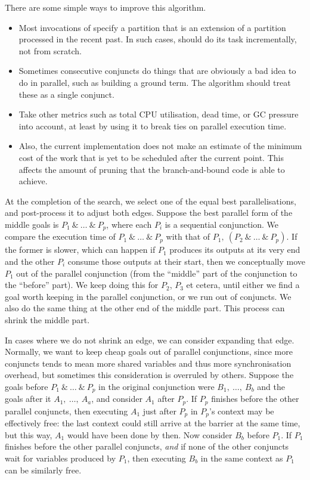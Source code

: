 There are some simple ways to improve this algorithm.

\begin{itemize}
\item
Most invocations of \findpartime specify a partition
that is an extension of a partition processed in the recent past.
In such cases, \findpartime should do its task
incrementally, not from scratch.
\item
Sometimes consecutive conjuncts do things that are
obviously a bad idea to do in parallel, such as building a ground term.
The algorithm should treat these as a single conjunct.
\item
Take other metrics such as total CPU utilisation, dead time, or GC pressure
into account,
at least by using it to break ties on parallel execution time.
\item
Also, the current implementation does not make an estimate of the
minimum cost of the work that is yet to be scheduled after the current point.
This affects the amount of pruning that the branch-and-bound code
is able to achieve.
\end{itemize}

\noindent
At the completion of the search,
we select one of the equal best parallelisations,
and post-process it to adjust both edges.
Suppose the best parallel form of the middle goals is $P_1~\&~\ldots~\&~P_p$,
where each $P_i$ is a sequential conjunction.
We compare the execution time of $P_1~\&~\ldots~\&~P_p$
with that of $P_1,~(P_2~\&~\ldots~\&~P_p)$.
If the former is slower,
which can happen if $P_1$ produces its outputs at its very end
and the other $P_i$ consume those outputs at their start,
then we conceptually move $P_1$ out of the parallel conjunction
(from the ``middle'' part of the conjunction to the ``before'' part).
We keep doing this for $P_2$, $P_3$ et cetera, until either
we find a goal worth keeping in the parallel conjunction,
or we run out of conjuncts.
We also do the same thing at the other end of the middle part.
This process can shrink the middle part.

In cases where we do not shrink an edge, we can consider expanding that edge.
Normally, we want to keep cheap goals out of parallel conjunctions,
since more conjuncts tends to mean
more shared variables and thus more synchronisation overhead,
but sometimes this consideration is overruled by others.
Suppose the goals before $P_1~\&~\ldots~\&~P_p$
in the original conjunction were $B_1,~\ldots,~B_b$
and the goals after it $A_1,~\ldots,~A_a$,
and consider $A_1$ after $P_p$.
If $P_p$ finishes before the other parallel conjuncts,
then executing $A_1$ just after $P_p$ in $P_p$'s context
may be effectively free:
the last context could still arrive at the barrier at the same time,
but this way, $A_1$ would have been done by then.
Now consider $B_b$ before $P_1$.
If $P_1$ finishes before the other parallel conjuncts,
\emph{and} if none of the other conjuncts wait for variables produced by $P_1$,
then executing $B_b$ in the same context as $P_1$ can be similarly free.

